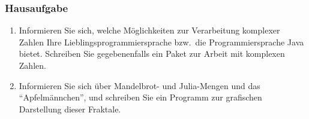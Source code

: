 \subsubsection*{Hausaufgabe}
\begin{enumerate}
\item{}Informieren Sie sich, welche Möglichkeiten zur Verarbeitung komplexer
Zahlen Ihre Lieblingsprogrammiersprache bzw.\ die Programmiersprache Java
bietet. Schreiben Sie gegebenenfalls ein Paket zur Arbeit mit komplexen
Zahlen.

\item{}Informieren Sie sich über Mandelbrot- und Julia-Mengen und das
"`Apfelmännchen"', und schreiben Sie ein Programm zur grafischen Darstellung
dieser Fraktale.

\end{enumerate}
